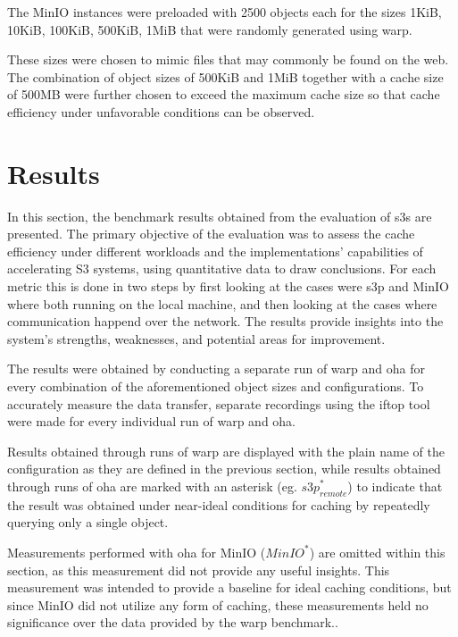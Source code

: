 The MinIO instances were preloaded with 2500 objects each for the sizes 1KiB, 10KiB, 100KiB, 500KiB, 1MiB that were randomly generated using warp.

These sizes were chosen to mimic files that may commonly be found on the web. The combination of object sizes of 500KiB and 1MiB together with a cache size of 500MB were further chosen to exceed the maximum cache size so that cache efficiency under unfavorable conditions can be observed.

\section{Results}

In this section, the benchmark results obtained from the evaluation of s3s are presented. The primary objective of the evaluation was to assess the cache efficiency under different workloads and the implementations' capabilities of accelerating S3 systems, using quantitative data to draw conclusions. For each metric this is done in two steps by first looking at the cases were s3p and MinIO where both running on the local machine, and then looking at the cases where communication happend over the network. The results provide insights into the system's strengths, weaknesses, and potential areas for improvement.

The results were obtained by conducting a separate run of warp and oha for every combination of the aforementioned object sizes and configurations. To accurately measure the data transfer, separate recordings using the iftop tool were made for every individual run of warp and oha.

Results obtained through runs of warp are displayed with the plain name of the configuration as they are defined in the previous section, while results obtained through runs of oha are marked with an asterisk (eg. ${s3p}^{*}_{remote}$) to indicate that the result was obtained under near-ideal conditions for caching by repeatedly querying only a single object.

Measurements performed with oha for MinIO (${MinIO}^{*}$) are omitted within this section, as this measurement did not provide any useful insights. This measurement was intended to provide a baseline for ideal caching conditions, but since MinIO did not utilize any form of caching, these measurements held no significance over the data provided by the warp benchmark..


